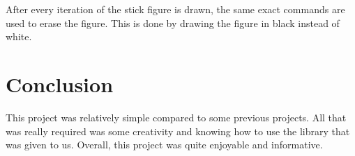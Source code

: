 \documentclass{article}
\begin{document}
After every iteration of the stick figure is drawn, the same
exact commands are used to erase the figure. This is done
by drawing the figure in black instead of white.

\section{Conclusion}
This project was relatively simple compared to some
previous projects. All that was really required was some
creativity and knowing how to use the library that was
given to us. Overall, this project was quite enjoyable
and informative.
\end{document}
